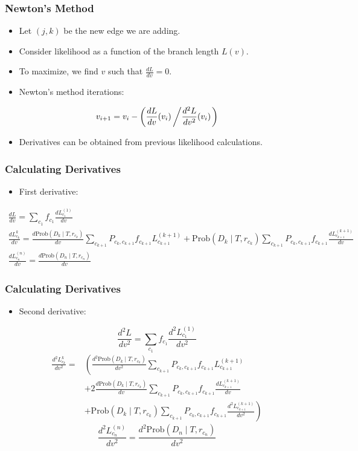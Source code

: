 \documentclass{beamer}
\newcommand{\prob}{\mathrm{Prob}}
\begin{document}
\begin{frame}
    \frametitle{Newton's Method}
    \begin{itemize}
        \item Let $(j,k)$ be the new edge we are adding.
        \item Consider likelihood as a function of the branch length $L(v)$.
        \item To maximize, we find $v$ such that $\frac{dL}{dv} = 0$.
        \item Newton's method iterations:
    \end{itemize}
    \begin{gather*}
        v_{i+1} = v_i - \left( \frac{dL}{dv}(v_i) \left/ \frac{d^2L}{dv^2}(v_i) \right. \right)
    \end{gather*}
    \begin{itemize}
        \item Derivatives can be obtained from previous likelihood calculations.
    \end{itemize}
\end{frame}

\begin{frame}
    \frametitle{Calculating Derivatives}
    \begin{itemize}
    \item First derivative:
    \end{itemize}
    \tiny
    \begin{gather*}
        \frac{dL}{dv} = \sum_{c_1}f_{c_1}\frac{dL_{c_1}^{(1)}}{dv} \\
        \frac{dL_{c_k}^{k}}{dv} = 
            \frac{d\prob(D_k \mid T, r_{c_k})}{dv}
            \sum_{c_{k+1}}P_{c_k, c_{k+1}}f_{c_{k+1}}L_{c_{k+1}}^{(k+1)}
            + \prob(D_k \mid T, r_{c_k})
            \sum_{c_{k+1}}P_{c_k, c_{k+1}}f_{c_{k+1}} \frac{dL_{c_{k+1}}^{(k+1)}}{dv} \\
        \frac{dL_{c_n}^{(n)}}{dv} = \frac{d\prob(D_n \mid T, r_{c_n})}{dv}
    \end{gather*}
\end{frame}

\begin{frame}
    \frametitle{Calculating Derivatives}
    \begin{itemize}
    \item Second derivative:
    \end{itemize}
    \tiny
    \[
        \frac{d^2L}{dv^2} = \sum_{c_1}f_{c_1}\frac{d^2L_{c_1}^{(1)}}{dv^2}
    \]
    \begin{align*}
        \frac{d^2L_{c_k}^{k}}{dv^2} 
        =& \left(\frac{d^2\prob(D_k \mid T, r_{c_k})}{dv^2}
            \sum_{c_{k+1}}P_{c_k, c_{k+1}}f_{c_{k+1}}L_{c_{k+1}}^{(k+1)}\right. \\
        &+2\frac{d\prob(D_k \mid T, r_{c_k})}{dv}
            \sum_{c_{k+1}}P_{c_k, c_{k+1}}f_{c_{k+1}}\frac{dL_{c_{k+1}}^{(k+1)}}{dv} \\
        &\left.+\prob(D_k \mid T, r_{c_k})
            \sum_{c_{k+1}}P_{c_k, c_{k+1}}f_{c_{k+1}} \frac{d^2L_{c_{k+1}}^{(k+1)}}{dv^2}\right)
    \end{align*}
    \[
        \frac{d^2L_{c_n}^{(n)}}{dv^2} = \frac{d^2\prob(D_n \mid T, r_{c_n})}{dv^2}
    \]
\end{frame}
\end{document}
